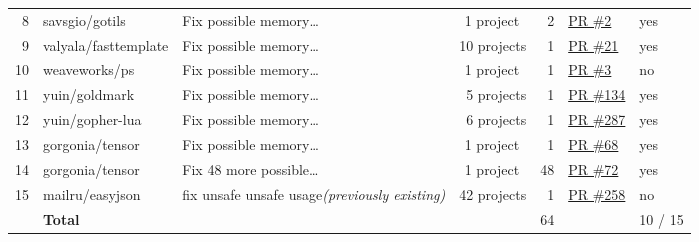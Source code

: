 \begin{table}[htp!]
{\begin{tabularx}{\textwidth}{rlXrrll}
        \rowcolor{verylightgray}
        8  & savsgio/gotils               & Fix possible memory\ldots                                       &  1 project~         &  2            & \href{https://github.com/savsgio/gotils/pull/2}{PR \#2}                & yes             \\
        9  & valyala/fasttemplate         & Fix possible memory\ldots                                       & 10 projects         &  1            & \href{https://github.com/valyala/fasttemplate/pull/21}{PR \#21}        & yes             \\
        \rowcolor{verylightgray}
        10 & weaveworks/ps                & Fix possible memory\ldots                                       &  1 project~         &  1            & \href{https://github.com/weaveworks/ps/pull/3}{PR \#3}                 & no              \\
        11 & yuin/goldmark                & Fix possible memory\ldots                                       &  5 projects         &  1            & \href{https://github.com/yuin/goldmark/pull/134}{PR \#134}             & yes             \\
        \rowcolor{verylightgray}
        12 & yuin/gopher-lua              & Fix possible memory\ldots                                       &  6 projects         &  1            & \href{https://github.com/yuin/gopher-lua/pull/287}{PR \#287}           & yes             \\
        13 & gorgonia/tensor              & Fix possible memory\ldots                                       &  1 project~         &  1            & \href{https://github.com/gorgonia/tensor/pull/68}{PR \#68}             & yes             \\
        \rowcolor{verylightgray}
        14 & gorgonia/tensor              & Fix 48 more possible\ldots                                      &  1 project~         & 48            & \href{https://github.com/gorgonia/tensor/pull/72}{PR \#72}             & yes             \\
        15 & mailru/easyjson              & fix unsafe unsafe usage\newline \textit{(previously existing)}  & 42 projects         &  1            & \href{https://github.com/mailru/easyjson/pull/258}{PR \#258}           & no              \\
        \hline
        {} & \multicolumn{3}{l}{\textbf{Total}}                                                                                   & 64            & {}                                                                     & 10 / 15         \\
        \end{tabularx}
    }
\end{table}
